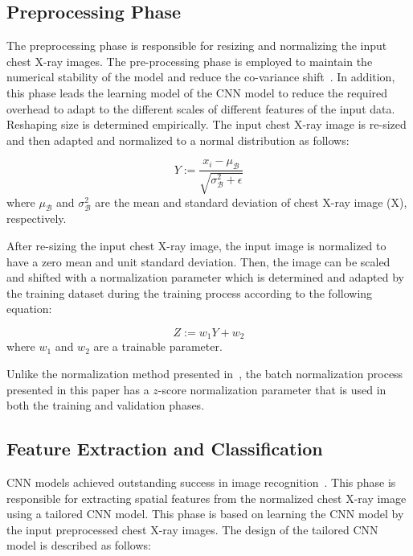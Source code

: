 \subsection{Preprocessing Phase}

The preprocessing phase is responsible for resizing and normalizing the input chest X-ray images. The pre-processing phase is employed to maintain the numerical stability of the model and reduce the co-variance shift~\cite{lecun1989handwritten}. In addition, this phase leads the learning model of the CNN model to reduce the required overhead to adapt to the different scales of different features of the input data. Reshaping size is determined empirically. The input chest X-ray image is re-sized and then adapted and normalized to a normal distribution as follows\cite{ioffe2015batch}:

\begin{equation}
Y := \frac{x_i - \mu_{\mathcal B}}{\sqrt{\sigma_{\mathcal B}^2 + \epsilon}}
\label{eq1}
\end{equation}
where $\mu_{\mathcal B}$ and $\sigma_{\mathcal B}^2$ are the mean and standard deviation of chest X-ray image (X), respectively.

After re-sizing the input chest X-ray image, the input image is normalized to have a zero mean and unit standard deviation. Then,  the image can be scaled and shifted with a normalization parameter which is determined and adapted by the training dataset during the training process according to the following equation: 

\begin{equation}
Z := w_1 Y + w_2
\label{eq2}
\end{equation}
where $w_1$ and $w_2$ are a trainable parameter.

Unlike the normalization method presented in~\cite{ioffe2015batch}, the batch normalization process presented in this paper has a $z$-score normalization parameter that is used in both the training and validation phases.


\subsection{Feature Extraction and Classification}

CNN models achieved outstanding success in image recognition~\cite{lecun2015deep}. This phase is responsible for extracting spatial features from the normalized chest X-ray image using a tailored CNN model.  This phase is based on learning the CNN model by the input preprocessed chest X-ray images. The design of the tailored CNN model is described as follows: 

